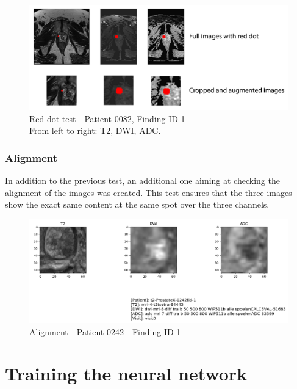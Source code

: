 \begin{figure}[!h]
\centering
\includegraphics[width=\textwidth, keepaspectratio=true]{./figures/test_red_dot.png}
\caption{Red dot test - Patient 0082, Finding ID 1\\From left to right: T2, DWI, ADC.}
\label{fig:reddot}
\end{figure}



\subsubsection{Alignment}
In addition to the previous test, an additional one aiming at checking the alignment of the images was created. This test ensures that the three images show the exact same content at the same spot over the three channels. 

\begin{figure}[!h]
\centering
\includegraphics[width=\textwidth, keepaspectratio=true]{./figures/alignment.png}
\caption{Alignment - Patient 0242 - Finding ID 1}
\label{fig:alignment}
\end{figure}


\section{Training the neural network}
